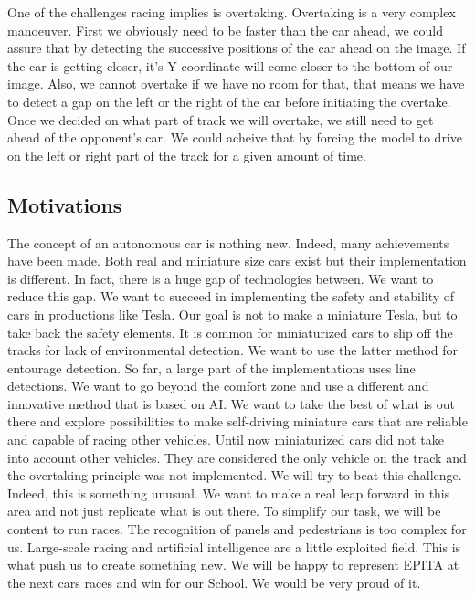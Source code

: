 \documentclass[12pt]{article}
\begin{document}
One of the challenges racing implies is overtaking. Overtaking is a very complex manoeuver. First we obviously need to be faster than the car ahead, we could assure that by detecting the successive positions of the car ahead on the image. If the car is getting closer, it's Y coordinate will come closer to the bottom of our image. Also, we cannot overtake if we have no room for that, that means we have to detect a gap on the left or the right of the car before initiating the overtake. Once we decided on what part of track we will overtake, we still need to get ahead of the opponent's car. We could acheive that by forcing the model to drive on the left or right part of the track for a given amount of time.

\subsection{Motivations}
The concept of an autonomous car is nothing new. Indeed, many achievements have been made. Both real and miniature size cars exist but their implementation is different. In fact, there is a huge gap of technologies between. We want to reduce this gap. We want to succeed in implementing the safety and stability of cars in productions like Tesla. Our goal is not to make a miniature Tesla, but to take back the safety elements. It is common for miniaturized cars to slip off the tracks for lack of environmental detection. We want to use the latter method for entourage detection. So far, a large part of the implementations uses line detections. We want to go beyond the comfort zone and use a different and innovative method that is based on AI. We want to take the best of what is out there and explore possibilities to make self-driving miniature cars that are reliable and capable of racing other vehicles. Until now miniaturized cars did not take into account other vehicles. They are considered the only vehicle on the track and the overtaking principle was not implemented. We will try to beat this challenge. Indeed, this is something unusual. We want to make a real leap forward in this area and not just replicate what is out there. To simplify our task, we will be content to run races. The recognition of panels and pedestrians is too complex for us. Large-scale racing and artificial intelligence are a little exploited field. This is what push us to create something new. We will be happy to represent EPITA at the next cars races and win for our School. We would be very proud of it.
\end{document}
